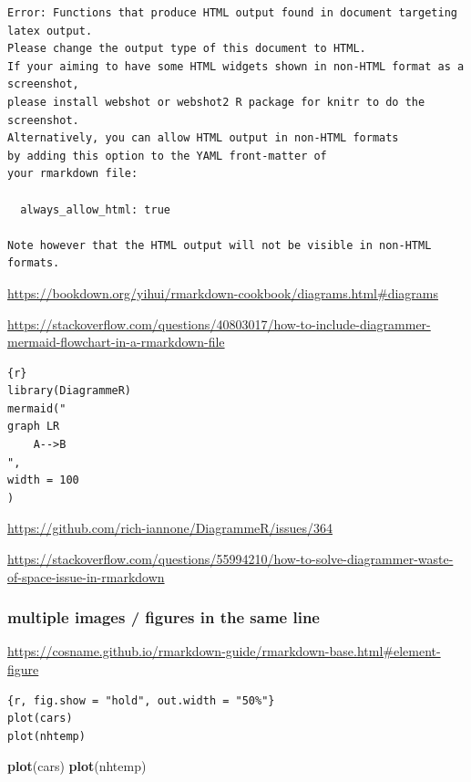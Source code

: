 \documentclass[
]{book}
\newenvironment{Shaded}{\begin{snugshade}}{\end{snugshade}}
\newcommand{\FunctionTok}[1]{\textcolor[rgb]{0.13,0.29,0.53}{\textbf{#1}}}
\newcommand{\NormalTok}[1]{#1}
\theoremstyle{definition}
\theoremstyle{definition}
\theoremstyle{definition}
\theoremstyle{definition}
\theoremstyle{remark}
\begin{document}
\begin{verbatim}
Error: Functions that produce HTML output found in document targeting latex output.
Please change the output type of this document to HTML.
If your aiming to have some HTML widgets shown in non-HTML format as a screenshot,
please install webshot or webshot2 R package for knitr to do the screenshot.
Alternatively, you can allow HTML output in non-HTML formats
by adding this option to the YAML front-matter of
your rmarkdown file:

  always_allow_html: true

Note however that the HTML output will not be visible in non-HTML formats.
\end{verbatim}

\url{https://bookdown.org/yihui/rmarkdown-cookbook/diagrams.html\#diagrams}

\url{https://stackoverflow.com/questions/40803017/how-to-include-diagrammer-mermaid-flowchart-in-a-rmarkdown-file}

\begin{verbatim}
{r}
library(DiagrammeR)
mermaid("
graph LR
    A-->B
",
width = 100
)
\end{verbatim}

\url{https://github.com/rich-iannone/DiagrammeR/issues/364}

\url{https://stackoverflow.com/questions/55994210/how-to-solve-diagrammer-waste-of-space-issue-in-rmarkdown}

\subsubsection{multiple images / figures in the same line}\label{multiple-images-figures-in-the-same-line}

\url{https://cosname.github.io/rmarkdown-guide/rmarkdown-base.html\#element-figure}

\begin{verbatim}
{r, fig.show = "hold", out.width = "50%"}
plot(cars)
plot(nhtemp)
\end{verbatim}

\begin{Shaded}
\begin{Highlighting}[]
\FunctionTok{plot}\NormalTok{(cars)}
\FunctionTok{plot}\NormalTok{(nhtemp)}
\end{Highlighting}
\end{Shaded}
\end{document}
